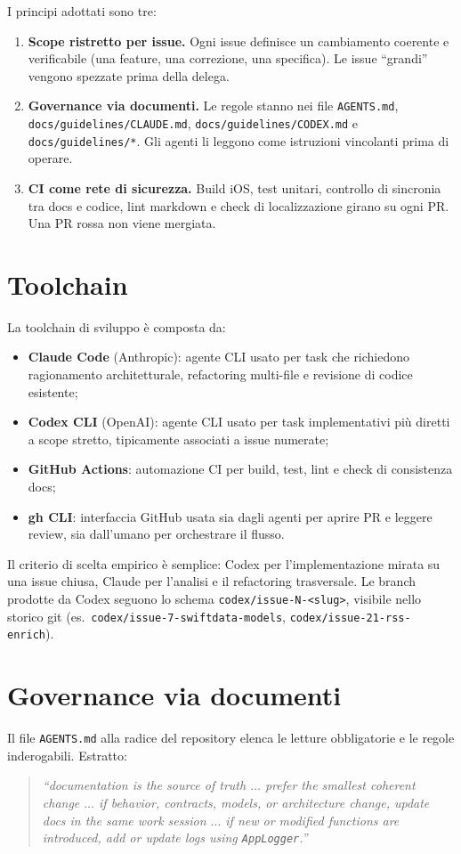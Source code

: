 I principi adottati sono tre:
\begin{enumerate}
  \item \textbf{Scope ristretto per issue.} Ogni issue definisce un cambiamento
        coerente e verificabile (una feature, una correzione, una specifica).
        Le issue ``grandi'' vengono spezzate prima della delega.
  \item \textbf{Governance via documenti.} Le regole stanno nei file
        \texttt{AGENTS.md}, \texttt{docs/guidelines/CLAUDE.md},
        \texttt{docs/guidelines/CODEX.md} e \texttt{docs/guidelines/*}. Gli
        agenti li leggono come istruzioni vincolanti prima di operare.
  \item \textbf{CI come rete di sicurezza.} Build iOS, test unitari, controllo
        di sincronia tra docs e codice, lint markdown e check di localizzazione
        girano su ogni PR. Una PR rossa non viene mergiata.
\end{enumerate}

\section{Toolchain}
La toolchain di sviluppo è composta da:
\begin{itemize}
  \item \textbf{Claude Code} (Anthropic): agente CLI usato per task che
        richiedono ragionamento architetturale, refactoring multi-file e
        revisione di codice esistente;
  \item \textbf{Codex CLI} (OpenAI): agente CLI usato per task implementativi
        più diretti a scope stretto, tipicamente associati a issue numerate;
  \item \textbf{GitHub Actions}: automazione CI per build, test, lint e check
        di consistenza docs;
  \item \textbf{gh CLI}: interfaccia GitHub usata sia dagli agenti per aprire
        PR e leggere review, sia dall'umano per orchestrare il flusso.
\end{itemize}

Il criterio di scelta empirico è semplice: Codex per l'implementazione mirata su
una issue chiusa, Claude per l'analisi e il refactoring trasversale. Le branch
prodotte da Codex seguono lo schema \texttt{codex/issue-N-<slug>}, visibile
nello storico git (es.\ \texttt{codex/issue-7-swiftdata-models},
\texttt{codex/issue-21-rss-enrich}).

\section{Governance via documenti}
Il file \texttt{AGENTS.md} alla radice del repository elenca le letture
obbligatorie e le regole inderogabili. Estratto:
\begin{quote}\small\itshape
``documentation is the source of truth $\dots$ prefer the smallest coherent
change $\dots$ if behavior, contracts, models, or architecture change, update
docs in the same work session $\dots$ if new or modified functions are
introduced, add or update logs using \texttt{AppLogger}.''
\end{quote}

